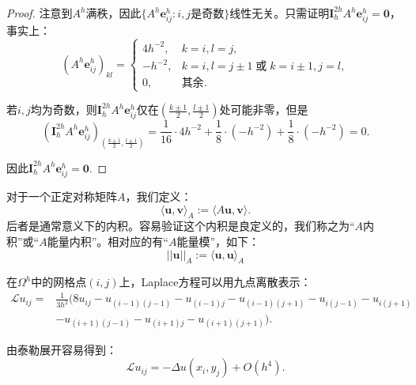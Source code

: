 \documentclass[lang=cn,10pt]{elegantbook}
\begin{document}
\begin{proof}
  注意到$A^h$满秩，因此$\{A^h\mathbf{e}^h_{ij}:i,j\text{是奇数}\}$线性无关。只需证明$\mathbf{I}^{2h}_{h}A^h\mathbf{e}^h_{ij}=\mathbf{0}$，事实上：
  \begin{equation*}
    (A^h\mathbf{e}^h_{ij})_{kl}=\left\{\begin{array}{ll}
      4h^{-2}, & k=i,l=j,\\
      -h^{-2}, & k=i,l=j\pm 1\;\text{或} \;k=i\pm 1,j=l,\\
      0, & \text{其余}.
    \end{array}\right.
  \end{equation*}

  若$i,j$均为奇数，则$\mathbf{I}^{2h}_{h}A^h\mathbf{e}^h_{ij}$仅在$\left(\frac{k\pm 1}{2},\frac{l \pm 1}{2}\right)$处可能非零，但是
  \begin{equation*}
    (\mathbf{I}^{2h}_{h}A^h\mathbf{e}^h_{ij})_{\left(\frac{k\pm 1}{2},\frac{l \pm 1}{2}\right)}=\frac{1}{16}\cdot 4h^{-2} + \frac{1}{8}\cdot (-h^{-2}) + \frac{1}{8}\cdot (-h^{-2}) = 0.
  \end{equation*}

  因此$\mathbf{I}^{2h}_{h}A^h\mathbf{e}^h_{ij}=\mathbf{0}$.
\end{proof}

\begin{definition}
  对于一个正定对称矩阵$A$，我们定义：
  \begin{equation}
    \langle \mathbf{u},\mathbf{v} \rangle_A := \langle A\mathbf{u},\mathbf{v} \rangle.
  \end{equation}
  后者是通常意义下的内积。容易验证这个内积是良定义的，我们称之为“$A$内积”或“$A$能量内积”。相对应的有“$A$能量模”，如下：
  \begin{equation}
    ||\mathbf{u}||_A:=\langle \mathbf{u},\mathbf{u} \rangle_A
  \end{equation}
\end{definition}

\begin{lemma}
  在$\Omega^h$中的网格点$(i,j)$上，Laplace方程可以用九点离散表示：
  \begin{align}
    \mathcal{L} u_{ij} =& \frac{1}{3h^2}(8u_{ij}-u_{(i-1)(j-1)}-u_{(i-1)j}-u_{(i-1)(j+1)}-u_{i(j-1)}-u_{i(j+1)} \nonumber \\
    &-u_{(i+1)(j-1)}-u_{(i+1)j}-u_{(i+1)(j+1)}).
  \end{align}

  由泰勒展开容易得到：
  \begin{equation}
    \mathcal{L} u_{ij}=-\Delta u(x_i,y_j)+O(h^4).
  \end{equation}
\end{lemma}
\end{document}
